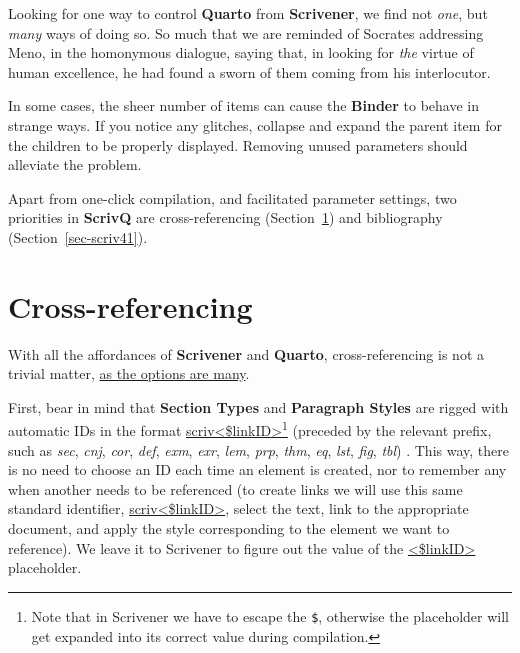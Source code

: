 \documentclass[
  12pt,
  a4paper,
  oneside,
  numbers=noenddot,
  titlepage,
  toclink=all,
  toc=bibliography]{scrbook}
\theoremstyle{definition}
\theoremstyle{definition}
\theoremstyle{definition}
\theoremstyle{plain}
\theoremstyle{plain}
\theoremstyle{plain}
\theoremstyle{plain}
\theoremstyle{plain}
\theoremstyle{remark}
\begin{document}
Looking for one way to control \textbf{Quarto} from \textbf{Scrivener},
we find not \emph{one}, but \emph{many} ways of doing so. So much that
we are reminded of Socrates addressing Meno, in the homonymous dialogue,
saying that, in looking for \emph{the} virtue of human excellence, he
had found a sworn of them coming from his interlocutor.

\begin{tcolorbox}[enhanced jigsaw, rightrule=.15mm, bottomtitle=1mm, colback=white, toptitle=1mm, left=2mm, colbacktitle=quarto-callout-caution-color!10!white, opacitybacktitle=0.6, opacityback=0, arc=.35mm, leftrule=.75mm, toprule=.15mm, titlerule=0mm, breakable, coltitle=black, bottomrule=.15mm, colframe=quarto-callout-caution-color-frame, title=\textcolor{quarto-callout-caution-color}{\faFire}\hspace{0.5em}{Binder glitches}]

In some cases, the sheer number of items can cause the \textbf{Binder}
to behave in strange ways. If you notice any glitches, collapse and
expand the parent item for the children to be properly displayed.
Removing unused parameters should alleviate the problem.

\end{tcolorbox}

Apart from one-click compilation, and facilitated parameter settings,
two priorities in \textbf{ScrivQ} are cross-referencing
(\protect\hypertarget{cite_4}{}{\label{cite_4}Section~\ref{sec-scriv3}})
and bibliography
(\protect\hypertarget{cite_5}{}{\label{cite_5}Section~\ref{sec-scriv41}}).

\hypertarget{sec-scriv3}{%
\chapter{Cross-referencing}\label{sec-scriv3}}

With all the affordances of \textbf{Scrivener} and \textbf{Quarto},
cross-referencing is not a trivial matter, \ul{as the options are many}.

{}First,
bear in mind that \textbf{Section Types} and \textbf{Paragraph Styles}
are rigged with automatic IDs in the format
\ul{scriv\textless\$linkID\textgreater{}}\footnote{Note that in
  Scrivener we have to escape the \texttt{\$}, otherwise the placeholder
  will get expanded into its correct value during compilation.}
(preceded by the relevant prefix, such as \emph{sec}, \emph{cnj},
\emph{cor}, \emph{def}, \emph{exm}, \emph{exr}, \emph{lem}, \emph{prp},
\emph{thm}, \emph{eq}, \emph{lst}, \emph{fig}, \emph{tbl}) . This way,
there is no need to choose an ID each time an element is created, nor to
remember any when another needs to be referenced (to create links we
will use this same standard identifier,
\ul{scriv\textless\$linkID\textgreater{}}, select the text, link to the
appropriate document, and apply the style corresponding to the element
we want to reference). We leave it to Scrivener to figure out the value
of the \ul{\textless\$linkID\textgreater{}} placeholder.
\end{document}
